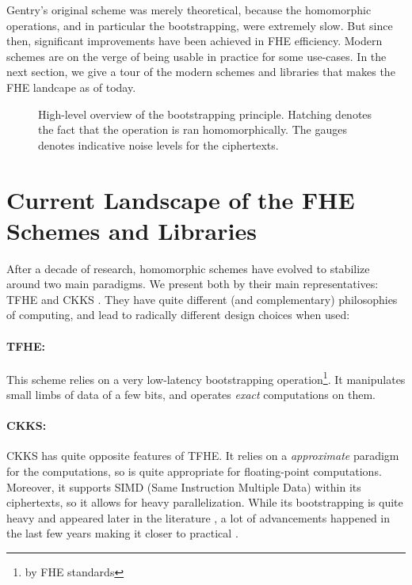 Gentry's original scheme was merely theoretical, because the homomorphic operations, and in particular the bootstrapping, were extremely slow. But since then, significant improvements have been achieved in FHE efficiency. Modern schemes are on the verge of being usable in practice for some use-cases. In the next section, we give a tour of the modern schemes and libraries that makes the FHE landcape as of today.



\begin{figure}
	\centering
	
	\caption{High-level overview of the bootstrapping principle. Hatching denotes the fact that the operation is ran homomorphically. The gauges denotes indicative noise levels for the ciphertexts.}
	\label{fig:bootstrapping_principle}
\end{figure}


\section{Current Landscape of the FHE Schemes and Libraries}
\label{sec:landscape}

After a decade of research, homomorphic schemes have evolved to stabilize around two main paradigms. We present both by their main representatives: TFHE \cite{JC:CGGI20} and CKKS \cite{AC:CKKS17}. They have quite different (and complementary) philosophies of computing, and lead to radically different design choices when used:


\paragraph{TFHE:} This scheme relies on a very low-latency bootstrapping operation\footnote{by FHE standards}. It manipulates small limbs of data of a few bits, and operates \textit{exact} computations on them.


\paragraph{CKKS:} CKKS has quite opposite features of TFHE. It relies on a \textit{approximate} paradigm for the computations, so is quite appropriate for floating-point computations. Moreover, it supports SIMD (Same Instruction Multiple Data) within its ciphertexts, so it allows for heavy parallelization. While its bootstrapping is quite heavy and appeared later in the literature \cite{EC:CHKKS18}, a lot of advancements happened in the last few years making it closer to practical \cite{EC:CheChiSon19, RSA:HanKi20, AC:KPKKM22}.


